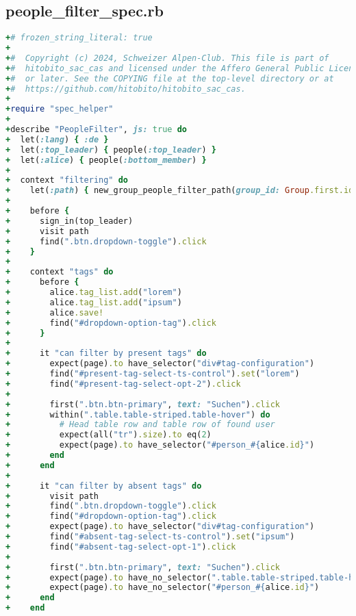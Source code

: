\subsection{people\_filter\_spec.rb}
\begin{lstlisting}[language=Ruby]
    +# frozen_string_literal: true
+
+#  Copyright (c) 2024, Schweizer Alpen-Club. This file is part of
+#  hitobito_sac_cas and licensed under the Affero General Public License version 3
+#  or later. See the COPYING file at the top-level directory or at
+#  https://github.com/hitobito/hitobito_sac_cas.
+
+require "spec_helper"
+
+describe "PeopleFilter", js: true do
+  let(:lang) { :de }
+  let(:top_leader) { people(:top_leader) }
+  let(:alice) { people(:bottom_member) }
+
+  context "filtering" do
+    let(:path) { new_group_people_filter_path(group_id: Group.first.id) }
+
+    before {
+      sign_in(top_leader)
+      visit path
+      find(".btn.dropdown-toggle").click
+    }
+
+    context "tags" do
+      before {
+        alice.tag_list.add("lorem")
+        alice.tag_list.add("ipsum")
+        alice.save!
+        find("#dropdown-option-tag").click
+      }
+
+      it "can filter by present tags" do
+        expect(page).to have_selector("div#tag-configuration")
+        find("#present-tag-select-ts-control").set("lorem")
+        find("#present-tag-select-opt-2").click
+
+        first(".btn.btn-primary", text: "Suchen").click
+        within(".table.table-striped.table-hover") do
+          # Head table row and table row of found user
+          expect(all("tr").size).to eq(2)
+          expect(page).to have_selector("#person_#{alice.id}")
+        end
+      end
+
+      it "can filter by absent tags" do
+        visit path
+        find(".btn.dropdown-toggle").click
+        find("#dropdown-option-tag").click
+        expect(page).to have_selector("div#tag-configuration")
+        find("#absent-tag-select-ts-control").set("ipsum")
+        find("#absent-tag-select-opt-1").click
+
+        first(".btn.btn-primary", text: "Suchen").click
+        expect(page).to have_no_selector(".table.table-striped.table-hover")
+        expect(page).to have_no_selector("#person_#{alice.id}")
+      end
+    end
\end{lstlisting}

\newpage

